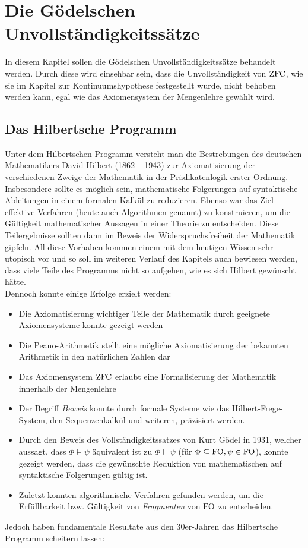 \clearpage

\section{Die Gödelschen Unvollständigkeitssätze}

In diesem Kapitel sollen die Gödelschen Unvollständigkeitssätze behandelt werden. 
Durch diese wird einsehbar sein, dass die Unvollständigkeit von $\operatorname{ZFC}$, wie sie im Kapitel zur Kontinuumshypothese festgestellt wurde, nicht behoben werden kann, egal wie das Axiomensystem der Mengenlehre gewählt wird.

\subsection{Das Hilbertsche Programm}

Unter dem Hilbertschen Programm versteht man die Bestrebungen des deutschen Mathematikers David Hilbert (1862 – 1943) zur Axiomatisierung der verschiedenen Zweige der Mathematik in der Prädikatenlogik erster Ordnung.
Insbesondere sollte es möglich sein, mathematische Folgerungen auf syntaktische Ableitungen in einem formalen Kalkül zu reduzieren. Ebenso war das Ziel effektive Verfahren (heute auch Algorithmen genannt) zu konstruieren, um die Gültigkeit mathematischer Aussagen in einer Theorie zu entscheiden.
Diese Teilergebnisse sollten dann im Beweis der Widerspruchsfreiheit der Mathematik gipfeln. All diese Vorhaben kommen einem mit dem heutigen Wissen sehr utopisch vor und so soll im weiteren Verlauf des Kapitels auch bewiesen werden, dass viele Teile des Programms nicht so aufgehen, wie es sich Hilbert gewünscht hätte.\\
Dennoch konnte einige Erfolge erzielt werden:
\begin{itemize}
	\item Die Axiomatisierung wichtiger Teile der Mathematik durch geeignete Axiomensysteme konnte gezeigt werden
	\item Die Peano-Arithmetik stellt eine mögliche Axiomatisierung der bekannten Arithmetik in den natürlichen Zahlen dar
	\item Das Axiomensystem $\operatorname{ZFC}$ erlaubt eine Formalisierung der Mathematik innerhalb der Mengenlehre
	\item Der Begriff \textit{Beweis} konnte durch formale Systeme wie das Hilbert-Frege-System, den Sequenzenkalkül und weiteren, präzisiert werden.
	\item Durch den Beweis des Vollständigkeitssatzes von Kurt Gödel in 1931, welcher aussagt, dass $\Phi \models \psi$ äquivalent ist zu $\Phi \vdash \psi$ (für $\Phi\subseteq \operatorname{FO}, \psi\in \operatorname{FO}$), konnte gezeigt werden, dass die gewünschte Reduktion von mathematischen auf syntaktische Folgerungen gültig ist.
	\item Zuletzt konnten algorithmische Verfahren gefunden werden, um die Erfüllbarkeit bzw. Gültigkeit von \textit{Fragmenten} von $\operatorname{FO}$ zu entscheiden.
\end{itemize}
Jedoch haben fundamentale Resultate aus den 30er-Jahren das Hilbertsche Programm scheitern lassen:

